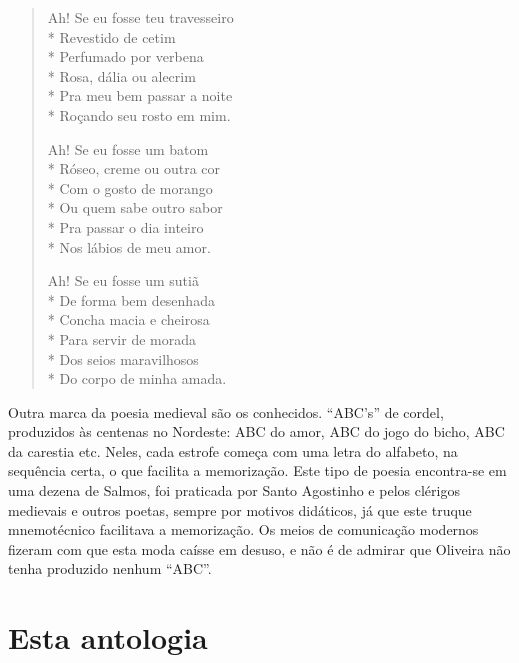 \begin{verse}

Ah! Se eu fosse teu travesseiro\\*
Revestido de cetim\\*
Perfumado por verbena\\*
Rosa, dália ou alecrim\\*
Pra meu bem passar a noite\\*
Roçando seu rosto em mim.

Ah! Se eu fosse um batom\\*
Róseo, creme ou outra cor\\*
Com o gosto de morango\\*
Ou quem sabe outro sabor\\*
Pra passar o dia inteiro\\*
Nos lábios de meu amor.

Ah! Se eu fosse um sutiã\\*
De forma bem desenhada\\*
Concha macia e cheirosa\\*
Para servir de morada\\*
Dos seios maravilhosos\\*
Do corpo de minha amada.

\end{verse}

\asterisc

Outra marca da poesia medieval são os conhecidos.
``ABC's'' de cordel,
produzidos às centenas no Nordeste:
ABC do amor, ABC do jogo do bicho, ABC da carestia etc.
Neles, cada estrofe começa com uma letra do alfabeto, na
sequência certa, o que facilita a memorização. Este tipo de
poesia encontra-se em uma dezena de Salmos, foi praticada
por Santo Agostinho e pelos clérigos medievais e outros
poetas, sempre por motivos didáticos, já que este truque
mnemotécnico facilitava a memorização. Os meios de
comunicação modernos fizeram com que esta moda caísse
em desuso, e não é de admirar que Oliveira não tenha
produzido nenhum ``ABC''.


\section{Esta antologia}

